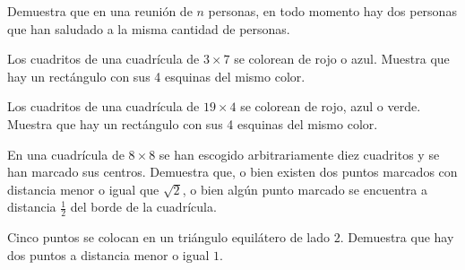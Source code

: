 \begin{proposicion}
Demuestra que en una reunión de $n$ personas, en todo momento hay dos personas que han saludado a la misma cantidad de personas.
\end{proposicion}
\vspace{2cm}

\begin{ejercicio}
Los cuadritos de una cuadrícula de $3\times 7$ se colorean de rojo o azul. Muestra que hay un rectángulo con sus 4 esquinas del mismo color. 
\end{ejercicio}

\begin{ejercicio}
Los cuadritos de una cuadrícula de $19\times 4$ se colorean de rojo, azul o verde. Muestra que hay un rectángulo con sus 4 esquinas del mismo color. 
\end{ejercicio}

\begin{problema}
En una cuadrícula de $8\times 8$ se han escogido arbitrariamente diez cuadritos y se han marcado sus centros. Demuestra que, o bien existen dos puntos marcados con distancia menor o igual que $\sqrt{2}$, o bien algún punto marcado se encuentra a distancia $\frac{1}{2}$ del borde de la cuadrícula. 
\end{problema}
  
 
\begin{ejercicio}
Cinco puntos se colocan en un triángulo equilátero de lado $2$. Demuestra que hay dos puntos a distancia menor o igual $1$.
\end{ejercicio}
\vspace{2cm}

